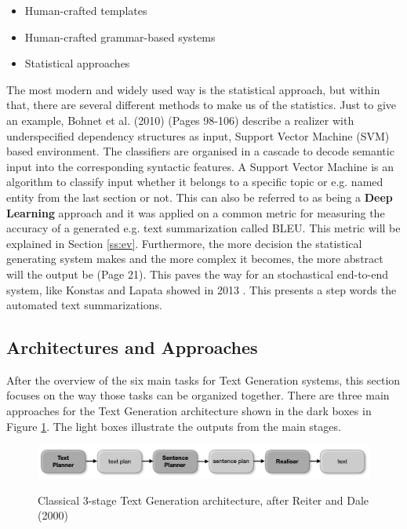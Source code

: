\begin{itemize}
	\item Human-crafted templates
	\item Human-crafted grammar-based systems
	\item Statistical approaches
\end{itemize}

The most modern and widely used way is the statistical approach, but within that, there are several different methods to make us of the statistics. Just to give an example, Bohnet et al. (2010) \cite{bohnet-etal-2010-broad} (Pages 98-106) describe a realizer with underspecified dependency structures as input, Support Vector Machine (SVM) based environment. The classifiers are organised in a cascade to decode semantic input into the corresponding syntactic features. A Support Vector Machine is an algorithm to classify input whether it belongs to a specific topic or e.g. named entity from the last section or not. This can also be referred to as being a \textbf{Deep Learning} approach and it was applied on a common metric for measuring the accuracy of a generated e.g. text summarization called BLEU. This metric will be explained in Section \ref{ss:ev}. Furthermore, the more decision the statistical generating system makes and the more complex it becomes, the more abstract will the output be \cite{gall} (Page 21). This paves the way for an stochastical end-to-end system, like Konstas and Lapata showed in 2013 \cite{Konstas:Lapata:2013}. This presents a step words the automated text summarizations.

\subsection{Architectures and Approaches}\label{ss:archi}

After the overview of the six main tasks for Text Generation systems, this section focuses on the way those tasks can be organized together. There are three main approaches for the Text Generation architecture shown in the dark boxes in Figure \ref{architecture}. The light boxes illustrate the outputs from the main stages.

\begin{figure}
	\begin{center}
		\includegraphics[width=6in]{photos/architecture}\\
		\caption{Classical 3-stage Text Generation architecture, after Reiter and Dale (2000) \cite{reiter2} }\label{architecture}
	\end{center}
\end{figure}


